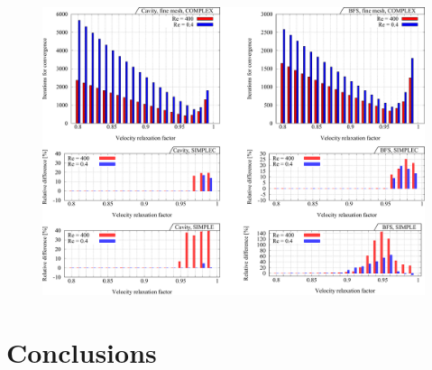 \documentclass[final,3p,times,10pt,onecolumn]{myElsarticle}
\numberwithin{equation}{section}
\begin{document}
\begin{figure}[h!]
\centering
\includegraphics[width=17cm]{fig/Results/complexFine.pdf}
\caption{}
\label{Fig:complexFine}
\end{figure}













\section{Conclusions}
\label{sec:conclusions}
\end{document}
